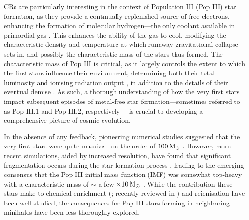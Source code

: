 \documentclass[usenatbib]{mn2e}
\newcommand{\msun}{\,{\rm M}_{\odot}}
\begin{document}
CRs are particularly interesting in the context of Population III (Pop III) star formation, as they provide a continually replenished source of free electrons, enhancing the formation of molecular hydrogen---the only coolant available in primordial gas \citep{Abeletal1997,GalliPalla1998,BrommCoppiLarson2002}.  
This enhances the ability of the gas to cool, modifying the characteristic density and temperature at which runaway gravitational collapse sets in, and possibly the characteristic mass of the stars thus formed.   
The characteristic mass of Pop III is critical, as it largely controls the extent to which the first stars influence their environment, determining both their total luminosity and ionising radiation output \citep{Schaerer2002}, in addition to the details of their eventual demise \citep{Hegeretal2003,HegerWoosley2010,MaederMeynet2012}. 
As such, a thorough understanding of how the very first stars impact subsequent episodes of metal-free star formation---sometimes referred to as Pop III.1 and Pop III.2, respectively \citep{McKeeTan2008}---is crucial to developing a comprehensive picture of cosmic evolution.

In the absence of any feedback, pioneering numerical studies suggested that the very first stars were quite massive---on the order of $100\msun$ \citep[e.g.,][]{BrommCoppiLarson1999,BrommCoppiLarson2002,AbelBryanNorman2002,Yoshidaetal2003,BrommLarson2004,Yoshidaetal2006,OSheaNorman2007}. 
However, more recent simulations, aided by increased resolution, have found that significant fragmentation occurs during the star formation process \citep{StacyGreifBromm2010,Clarketal2011a,Clarketal2011b,Greifetal2011,Greifetal2012,StacyBromm2013,Hiranoetal2014,Hosokawaetal2015}, leading to the emerging consensus that the Pop III initial mass function (IMF) was somewhat top-heavy with a characteristic mass of $\sim$ a few $\times 10\msun$ \citep{Bromm2013}. 
While the contribution these stars make to chemical enrichment (\citealt{MadauFerraraRees2001,MoriFerraraMadau2002,BrommYoshidaHernquist2003,Hegeretal2003,UmedaNomoto2003,TornatoreFerraraSchneider2007,Greifetal2007,Greifetal2010,WiseAbel2008,Maioetal2011}; recently reviewed in \citealt{KarlssonBrommHawthorn2013}) and  reionisation \citep{Kitayamaetal2004,Sokasianetal2004,WhalenAbelNorman2004,AlvarezBrommShapiro2006,JohnsonGreifBromm2007,Robertsonetal2010} have been well studied, the consequences for Pop III stars forming in neighboring minihalos have been less thoroughly explored.  
\end{document}
